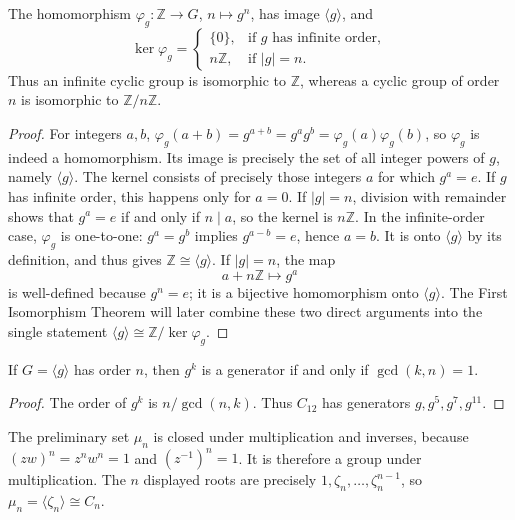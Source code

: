 \begin{proposition}
The homomorphism \(\varphi_g:\mathbb Z\to G\), \(n\mapsto g^n\), has image
\(\langle g\rangle\), and
\[
 \ker\varphi_g=
 \begin{cases}
 \{0\},&\text{if \(g\) has infinite order},\\[2pt]
 n\mathbb Z,&\text{if \(|g|=n\)}.
 \end{cases}
\]
Thus an infinite cyclic group is isomorphic to \(\mathbb Z\), whereas a
cyclic group of order \(n\) is isomorphic to \(\mathbb Z/n\mathbb Z\).
\end{proposition}
\begin{proof}
For integers \(a,b\),
\(\varphi_g(a+b)=g^{a+b}=g^ag^b=\varphi_g(a)\varphi_g(b)\), so
\(\varphi_g\) is indeed a homomorphism.  Its image is precisely the set of
all integer powers of \(g\), namely \(\langle g\rangle\).
The kernel consists of precisely those integers \(a\)
for which \(g^a=e\). If \(g\) has infinite order, this happens only for
\(a=0\). If \(|g|=n\), division with remainder shows that \(g^a=e\) if and
only if \(n\mid a\), so the kernel is \(n\mathbb Z\).  In the infinite-order
case, \(\varphi_g\) is one-to-one: \(g^a=g^b\) implies
\(g^{a-b}=e\), hence \(a=b\). It is onto \(\langle g\rangle\) by its
definition, and thus gives \(\mathbb Z\cong\langle g\rangle\).
If \(|g|=n\), the map
\[a+n\mathbb Z\longmapsto g^a\]
is well-defined because \(g^n=e\); it is a bijective homomorphism onto
\(\langle g\rangle\).  The First Isomorphism Theorem will later combine these
two direct arguments into the single statement
\(\langle g\rangle\cong\mathbb Z/\ker\varphi_g\).
\end{proof}

\begin{proposition}
If \(G=\langle g\rangle\) has order \(n\), then \(g^k\) is a generator if and
only if \(\gcd(k,n)=1\).
\end{proposition}
\begin{proof}
The order of \(g^k\) is \(n/\gcd(n,k)\).  Thus \(C_{12}\) has generators
\(g,g^5,g^7,g^{11}\).
\end{proof}

\begin{example}
The preliminary set \(\mu_n\) is closed under multiplication and inverses,
because \((zw)^n=z^nw^n=1\) and \((z^{-1})^n=1\). It is therefore a group
under multiplication. The \(n\) displayed roots are precisely
\(1,\zeta_n,\ldots,\zeta_n^{n-1}\), so
\(\mu_n=\langle\zeta_n\rangle\cong C_n\).
\end{example}

